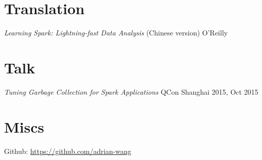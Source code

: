 \documentclass[line,margin]{res}
\begin{document}
\begin{resume}
\section{Translation}
            {\sl Learning Spark: Lightning-fast Data Analysis} (Chinese version) \hfill O'Reilly

\section{Talk}
            {\sl Tuning Garbage Collection for Spark Applications} \hfill QCon Shanghai 2015, Oct 2015\\

\section{Miscs}
            Github: \href{https://github.com/adrian-wang}{https://github.com/adrian-wang}
\end{resume}
\end{document}
